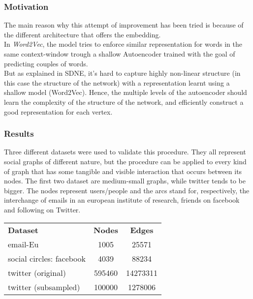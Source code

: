 \documentclass{article}
\begin{document}
				\subsubsection{Motivation}
				The main reason why this attempt of improvement has been tried is because of the different architecture that offers the embedding.\\
				In \textit{Word2Vec}, the model tries to enforce similar representation for words in the same context-window trough a shallow Autoencoder trained with the goal of predicting couples of words.\\
				But as explained in SDNE, it's hard to capture highly non-linear structure (in this case the structure of the network) with a representation learnt using a shallow model (Word2Vec). Hence, the multiple levels of the autoencoder should learn the complexity of the structure of the network, and efficiently construct a good representation for each vertex.
				
				\subsubsection{Results}
				Three different datasets were used to validate this procedure. They all represent social graphs of different nature, but the procedure can be applied to every kind of graph that has some tangible and visible interaction that occurs between its nodes. The first two dataset are medium-small graphs, while twitter tends to be bigger. The nodes represent users/people and the arcs stand for, respectively, the interchange of emails in an european institute of research, friends on facebook and following on Twitter.
				\begin{center}
					\begin{tabular}{l | c | c}
						\textbf{Dataset} & \textbf{Nodes} & \textbf{Edges} \\
						email-Eu & 1005 & 25571 \\
						social circles: facebook & 4039 & 88234 \\
						twitter (original) & 595460 & 14273311\\
						twitter (subsampled) & 100000 & 1278006
					\end{tabular}	
				\end{center}
			
\end{document}

